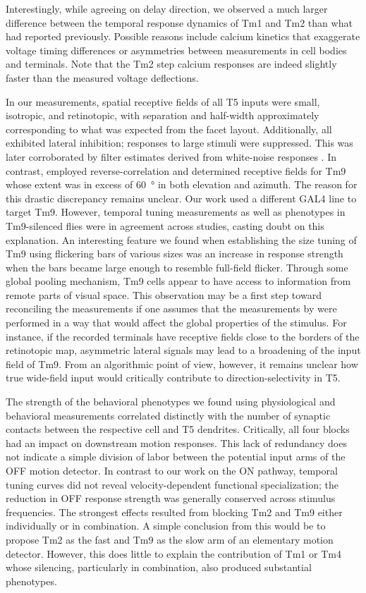 Interestingly, while agreeing on delay direction, we observed a much larger difference between the temporal response dynamics of Tm1 and Tm2 than what \citet{Behnia:2014jh} had reported previously. Possible reasons include calcium kinetics that exaggerate voltage timing differences or asymmetries between measurements in cell bodies and terminals. Note that the Tm2 step calcium responses are indeed slightly faster than the measured voltage deflections.

In our measurements, spatial receptive fields of all T5 inputs were small, isotropic, and retinotopic, with separation and half-width approximately corresponding to what was expected from the facet layout. Additionally, all exhibited lateral inhibition; responses to large stimuli were suppressed. This was later corroborated by filter estimates derived from white-noise responses \citep{Arenz:2017aa}. In contrast, \citet{Fisher:2015aa} employed reverse-correlation and determined receptive fields for Tm9 whose extent was in excess of \SI{60}{\degree} in both elevation and azimuth. The reason for this drastic discrepancy remains unclear. Our work used a different GAL4 line to target Tm9. However, temporal tuning measurements as well as phenotypes in Tm9-silenced flies were in agreement across studies, casting doubt on this explanation. An interesting feature we found when establishing the size tuning of Tm9 using flickering bars of various sizes was an increase in response strength when the bars became large enough to resemble full-field flicker. Through some global pooling mechanism, Tm9 cells appear to have access to information from remote parts of visual space. This observation may be a first step toward reconciling the measurements if one assumes that the measurements by \citet{Fisher:2015aa} were performed in a way that would affect the global properties of the stimulus. For instance, if the recorded terminals have receptive fields close to the borders of the retinotopic map, asymmetric lateral signals may lead to a broadening of the input field of Tm9. From an algorithmic point of view, however, it remains unclear how true wide-field input would critically contribute to direction-selectivity in T5.

The strength of the behavioral phenotypes we found using physiological and behavioral measurements correlated distinctly with the number of synaptic contacts between the respective cell and T5 dendrites. Critically, all four blocks had an impact on downstream motion responses. This lack of redundancy does not indicate a simple division of labor between the potential input arms of the OFF motion detector. In contrast to our work on the ON pathway, temporal tuning curves did not reveal velocity-dependent functional specialization; the reduction in OFF response strength was generally conserved across stimulus frequencies. The strongest effects resulted from blocking Tm2 and Tm9 either individually or in combination. A simple conclusion from this would be to propose Tm2 as the fast and Tm9 as the slow arm of an elementary motion detector. However, this does little to explain the contribution of Tm1 or Tm4 whose silencing, particularly in combination, also produced substantial phenotypes.

